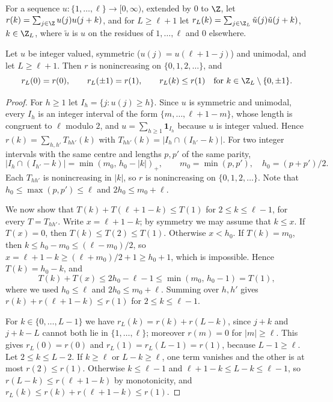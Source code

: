 For a sequence $u \colon \{1, \dots, \ell\} \to [0, \infty)$, extended by $0$ to $\Z$, let $r(k) = \sum_{j \in \Z} u(j) u(j + k)$, and for $L \ge \ell + 1$ let $r_L(k) = \sum_{j \in \Z_L} \tilde u(j) \tilde u(j + k)$, $k \in \Z_L$, where $\tilde u$ is $u$ on the residues of $1, \dots, \ell$ and $0$ elsewhere.

\begin{lemma}\label{l:autocorr}
Let $u$ be integer valued, symmetric ($u(j) = u(\ell + 1 - j)$) and unimodal, and let $L \ge \ell + 1$. Then $r$ is nonincreasing on $\{0, 1, 2, \dots\}$, and
\begin{equation}\label{e:autocorr}
r_L(0) = r(0), \qquad r_L(\pm 1) = r(1), \qquad r_L(k) \le r(1) \quad \text{for } k \in \Z_L \setminus \{0, \pm 1\} .
\end{equation}
\end{lemma}

\begin{proof}
For $h \ge 1$ let $I_h = \{ j : u(j) \ge h\}$. Since $u$ is symmetric and unimodal, every $I_h$ is an integer interval of the form $\{m, \dots, \ell + 1 - m\}$, whose length is congruent to $\ell$ modulo $2$, and $u = \sum_{h \ge 1} \mathbf 1_{I_h}$ because $u$ is integer valued. Hence $r(k) = \sum_{h, h'} T_{h h'}(k)$ with $T_{h h'}(k) = |I_h \cap (I_{h'} - k)|$. For two integer intervals with the same centre and lengths $p, p'$ of the same parity,
\begin{equation}\label{e:T}
|I_h \cap (I_{h'} - k)| = \min(m_0, \, h_0 - |k|)_+, \qquad m_0 = \min(p, p'), \quad h_0 = (p + p')/2 .
\end{equation}
Each $T_{hh'}$ is nonincreasing in $|k|$, so $r$ is nonincreasing on $\{0, 1, 2, \dots\}$. Note that $h_0 \le \max(p, p') \le \ell$ and $2 h_0 \le m_0 + \ell$.

We now show that $T(k) + T(\ell + 1 - k) \le T(1)$ for $2 \le k \le \ell - 1$, for every $T = T_{hh'}$. Write $x = \ell + 1 - k$; by symmetry we may assume that $k \le x$. If $T(x) = 0$, then $T(k) \le T(2) \le T(1)$. Otherwise $x < h_0$. If $T(k) = m_0$, then $k \le h_0 - m_0 \le (\ell - m_0)/2$, so $x = \ell + 1 - k \ge (\ell + m_0)/2 + 1 \ge h_0 + 1$, which is impossible. Hence $T(k) = h_0 - k$, and
\begin{equation*}
T(k) + T(x) \le 2 h_0 - \ell - 1 \le \min(m_0, \, h_0 - 1) = T(1),
\end{equation*}
where we used $h_0 \le \ell$ and $2 h_0 \le m_0 + \ell$. Summing over $h, h'$ gives $r(k) + r(\ell + 1 - k) \le r(1)$ for $2 \le k \le \ell - 1$.

For $k \in \{0, \dots, L - 1\}$ we have $r_L(k) = r(k) + r(L - k)$, since $j + k$ and $j + k - L$ cannot both lie in $\{1, \dots, \ell\}$; moreover $r(m) = 0$ for $|m| \ge \ell$. This gives $r_L(0) = r(0)$ and $r_L(1) = r_L(L - 1) = r(1)$, because $L - 1 \ge \ell$. Let $2 \le k \le L - 2$. If $k \ge \ell$ or $L - k \ge \ell$, one term vanishes and the other is at most $r(2) \le r(1)$. Otherwise $k \le \ell - 1$ and $\ell + 1 - k \le L - k \le \ell - 1$, so $r(L - k) \le r(\ell + 1 - k)$ by monotonicity, and $r_L(k) \le r(k) + r(\ell + 1 - k) \le r(1)$.
\end{proof}

